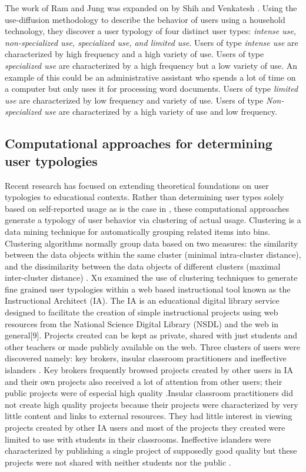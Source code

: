\documentclass{acm_proc_article-sp}
\begin{document}
The work of Ram and Jung was expanded on by Shih and Venkatesh \cite{shih2004beyond}. Using the use-diffusion methodology to describe the behavior of users using a household technology, they discover a user typology of four distinct user types: \textit{intense use, non-specialized use, specialized use, and limited use}.
Users of type \textit{intense use} are characterized by high frequency and a high variety of use. Users of type \textit{specialized use} are characterized by a high frequency but a low variety of use. An example of this could be an administrative assistant who spends a lot of time on a computer but only uses it for processing word documents. Users of type \textit{limited use} are characterized by low frequency and variety of use. Users of type \textit{Non-specialized use} are characterized by a high variety of use and low frequency.

\subsection{Computational approaches for determining user typologies}
Recent research has focused on extending theoretical foundations on user typologies to educational contexts. Rather than determining user types solely based on self-reported usage as is the case in \cite{shih2004beyond,ram1990conceptualization}, these computational approaches generate a typology of user behavior via clustering of actual usage. Clustering is a data mining technique for automatically grouping related items into bins. Clustering algorithms normally group data based on two measures: the similarity between the data objects within the same cluster (minimal intra-cluster distance), and the dissimilarity between the data objects of different clusters (maximal inter-cluster distance) \cite{han2006data}. Xu \cite{xu} examined the use of clustering techniques to generate fine grained user typologies within a web based instructional tool known as the Instructional Architect (IA). The IA is an educational digital library service designed to facilitate the creation of simple instructional projects using web resources from the National Science Digital Library (NSDL) and the web in general[9]. Projects created can be kept as private, shared with just students and other teachers or made publicly available on the web. Three clusters of users were discovered namely: key brokers, insular classroom practitioners and ineffective islanders \cite{xu}.  Key brokers frequently browsed projects created by other users in IA and their own projects also received a lot of attention from other users; their public projects were of especial high quality \cite{xu}.Insular classroom practitioners did not create high quality projects because their projects were characterized by very little content and links to external resources. They had little interest in viewing projects created by other IA users and most of the projects they created were limited to use with students in their classrooms. Ineffective islanders were characterized by publishing a single project of supposedly good quality but these projects were not shared with neither students nor the public \cite{xu}.
\end{document}
